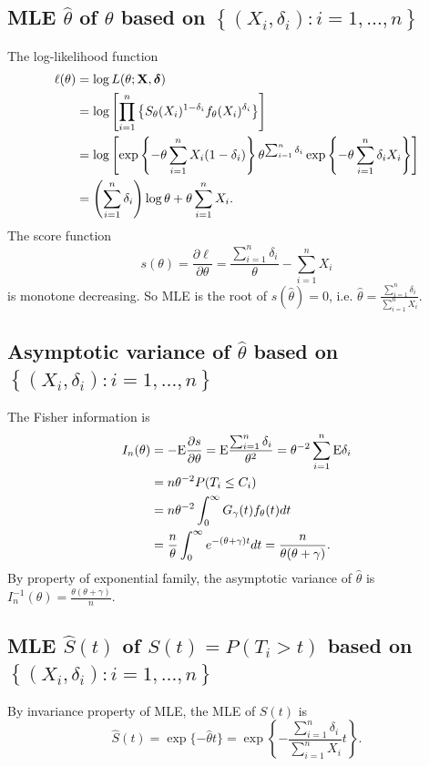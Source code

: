 \documentclass[11pt]{article}
\newcommand{\E}{\mbox{{\rm E}}}
\newcommand{\hS}{\hat{S}}
\newcommand{\htheta}{\hat{\theta}}
\newcommand{\bX}{{\bf{X}}}
\newcommand{\bdelta}{{\bm \delta}}
\begin{document}
\subsection{MLE $\htheta$ of $\theta$ based on $\left\{
  (X_i,\delta_i): i=1,\dots,n \right\}$}

The log-likelihood function
\begin{align*}
 \ell(\theta)  &= \log L(\theta;\bX,\bdelta)\\
  &=\log \left[ \prod_{i=1}^n \left\{ S_{\theta}(X_i)^{1-\delta_i}f_{\theta}(X_i)^{\delta_i} \right\} \right]\\
  &= \log \left[ \exp \left\{ -\theta\sum_{i=1}^n X_i(1-\delta_i) \right\}\theta^{\sum_{i=1}^n\delta_i}\exp \left\{ -\theta\sum_{i=1}^n \delta_iX_i \right\}\right]\\
  &= \left(\sum_{i=1}^n \delta_i  \right)\log\theta + \theta\sum_{i=1}^n X_i.
\end{align*}
The score function
\begin{equation*}
s(\theta)= \frac{\partial \ell}{\partial \theta} = \frac{\sum_{i=1}^n\delta_i}{\theta} -\sum_{i=1}^n X_i
\end{equation*}
is monotone decreasing. So MLE is the root of $s(\htheta)=0$, i.e. $\htheta =
\frac{\sum_{i=1}^n \delta_i}{\sum_{i=1}^nX_i}$.

\subsection{Asymptotic variance of $\htheta$ based on $\left\{
  (X_i,\delta_i): i=1,\dots,n \right\}$}

The Fisher information is
\begin{align*}
I_n(\theta) &= -\E \frac{\partial s}{\partial \theta} = \E \frac{\sum_{i=1}^n\delta_i}{\theta^2} = \theta^{-2}\sum_{i=1}^n\E\delta_i\\
  &= n\theta^{-2}P(T_i\leq C_i)\\
  &= n\theta^{-2}\int_0^{\infty} G_{\gamma}(t)f_{\theta}(t)dt\\
  &=\frac{n}{\theta}\int_0^{\infty} e^{-(\theta+\gamma)t}dt = \frac{n}{\theta(\theta+\gamma)}.
\end{align*}
By property of exponential family, the asymptotic variance of $\htheta$ is
$I_n^{-1}(\theta) = \frac{\theta(\theta+\gamma)}{n}$.

\subsection{MLE $\hS(t)$ of $S(t)=P(T_{i}>t)$ based on $\left\{
  (X_i,\delta_i): i=1,\dots,n \right\}$} 
By invariance property of MLE, the MLE of $S(t)$ is
\begin{equation*}
\hS(t) = \exp\{-\htheta t\} = \exp \left\{ -\frac{\sum_{i=1}^n\delta_i}{\sum_{i=1}^nX_i}t \right\}.
\end{equation*}
\end{document}
